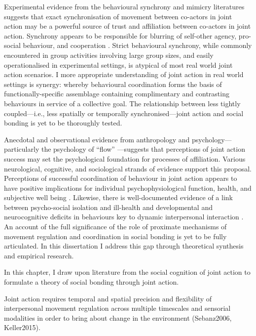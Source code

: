 \begin{CJK}{UTF8}{gbsn}
Experimental evidence from the behavioural synchrony and mimicry literatures suggests that exact synchronisation of movement between co-actors in joint action may be a powerful source of trust and affiliation between co-actors in joint action.  Synchrony appears to be responsible for blurring of self-other agency, pro-social behaviour, and cooperation \citep{Mogan2017}.   Strict behavioural synchrony, while commonly encountered in group activities involving large group sizes, and easily operationalised in experimental settings, is atypical of most real world joint action scenarios.  I more appropriate understanding of joint action in real world settings is synergy: whereby behavioural coordination forms the basis of functionally-specific assemblage containing complimentary and contrasting behaviours in service of a collective goal.  The relationship between less tightly coupled---i.e., less spatially or temporally synchronised---joint action and social bonding is yet to be thoroughly tested.

Anecdotal and observational evidence from anthropology and psychology---particularly the psychology of ``flow'' \citep{Csikszentmihalyi1992,Jackson1999}---suggests that perceptions of joint action success may set the psychological foundation for processes of affiliation.  Various neurological, cognitive, and sociological strands of evidence support this proposal.  Perceptions of successful coordination of behaviour in joint action appears to have positive implications for individual psychophysiological function, health, and subjective well being \citep{Wheatley2012}.  Likewise, there is well-documented evidence of a link between psycho-social isolation and ill-health and developmental and neurocognitive deficits in behaviours key to dynamic interpersonal interaction \citep[e.g.][]{Blakemore2005,Baron-Cohen1991}. An account of the full significance of the role of proximate mechanisms of movement regulation and coordination in social bonding is yet to be fully articulated. In this dissertation I address this gap through theoretical synthesis and empirical research.

In this chapter, I draw upon literature from the social cognition of joint action to formulate a theory of social bonding through joint action.




Joint action requires temporal and spatial precision and flexibility of interpersonal movement regulation across multiple timescales and sensorial modalities in order to bring about change in the environment (Sebanz2006, Keller2015).


\end{CJK}

